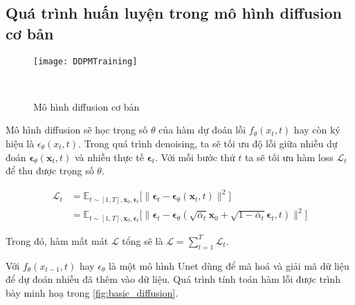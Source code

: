 \subsection{Quá trình huấn luyện trong mô hình diffusion cơ bản}
	
	\begin{figure}[H]
		\centering
		\texttt{[image: DDPMTraining]}
		\caption{Mô hình diffusion cơ bản}
		\label{fig:basic_diffusion}\
		\vspace{-5pt}
	\end{figure}
	
	Mô hình diffusion sẽ học trọng số $\theta$ của hàm dự đoán lỗi $f_{\theta} (x_t, t)$ hay còn ký hiệu là  $\epsilon_{\theta} (x_t, t)$. Trong quá trình denoising, ta sẽ tối ưu độ lỗi giữa nhiễu dự đoán $\boldsymbol{\epsilon}_\theta(\mathbf{x}_t, t)$ và nhiễu thực tế $\boldsymbol{\epsilon}_t$. Với mỗi bước thứ $t$ ta sẽ tối ưu hàm loss $\mathcal{L}_{t}$ để thu được trọng số $\theta$.
	
	\begin{equation}
		\label{eq:diffusion_loss}
		\begin{aligned}
			\mathcal{L}_t
			&= \mathbb{E}_{t \sim [1, T], \mathbf{x}_0, \boldsymbol{\epsilon}_t} \Big[\|\boldsymbol{\epsilon}_t - \boldsymbol{\epsilon}_\theta(\mathbf{x}_t, t)\|^2 \Big] \\
			&= \mathbb{E}_{t \sim [1, T], \mathbf{x}_0, \boldsymbol{\epsilon}_t} \Big[\|\boldsymbol{\epsilon}_t - \boldsymbol{\epsilon}_\theta(\sqrt{\bar{\alpha}_t}\mathbf{x}_0 + \sqrt{1 - \bar{\alpha}_t}\boldsymbol{\epsilon}_t, t)\|^2 \Big]
		\end{aligned}
	\end{equation}


Trong đó, hàm mất mát $\mathcal{L}$ tổng sẽ là  $\mathcal{L} = \sum_{t=1}^{T} \mathcal{L}_t$.

Với $f_{\theta}(x_{t-1}, t)$ hay $\epsilon_\theta$ là một mô hình Unet dùng để mã hoá và giải mã dữ liệu để dự đoán nhiễu đã thêm vào dữ liệu. Quá trình tính toán hàm lỗi được trình bày minh hoạ trong \autoref{fig:basic_diffusion}.


